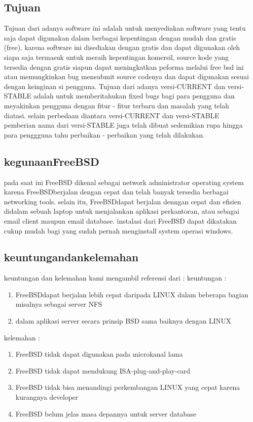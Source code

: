 {\subsection{Tujuan}
	Tujuan dari adanya software ini adalah untuk menyediakan software yang tentu saja dapat digunakan dalam berbagai kepentingan dengan mudah dan gratis (free). karena software ini disediakan dengan gratis dan dapat digunakan oleh siapa saja termasuk untuk meraih kepentingan komersil, 
	source kode yang tersedia dengan gratis siapun dapat meningkatkan  peforma melalui free bsd ini atau memungkinkan bug mensubmit source codenya dan dapat digunakan sesuai dengan keinginan si pengguna.
	Tujuan dari adanya versi-CURRENT dan versi-STABLE adalah untuk memberitahukan fixed bugs bagi para pengguna
	dan meyakinkan pengguna dengan fitur - fitur terbaru dan masalah yang telah diatasi. selain perbedaan diantara versi-CURRENT dan versi-STABLE
	pemberian nama dari versi-STABLE juga telah dibuat sedemikian rupa hingga para penggguna tahu  perbaikan - perbaikan yang telah dilakukan.
\subsection{kegunaanFreeBSD}
	pada saat ini FreeBSD dikenal sebagai network administrator operating system karena FreeBSDberjalan dengan cepat dan telah banyak tersedia berbagai networking tools. selain itu, FreeBSDdapat berjalan denngan cepat dan efisien didalam sebuah laptop untuk menjalankan aplikasi perkantoran, atau sebagai email client maupun email database.
	instalasi dari FreeBSD dapat dikatakan cukup mudah bagi yang sudah pernah menginstall system operasi windows.
\subsection{keuntungandankelemahan}
	keuntungan dan kelemahan kami mengambil referensi dari : \cite{nugroho2015analisis}
	keuntungan :
\begin{enumerate}
	\item FreeBSDdapat berjalan lebih cepat daripada LINUX dalam beberapa bagian misalnya sebagai server NFS
	\item dalam aplikasi server secara prinsip BSD sama baiknya dengan LINUX
\end{enumerate}
	kelemahan :
\begin{enumerate}
	\item FreeBSD tidak dapat digunakan pada microkanal lama
	\item FreeBSD tidak dapat mendukung ISA-plug-and-play-card
	\item FreeBSD tidak bisa menandingi perkembangan LINUX yang cepat karena kurangnya developer
	\item FreeBSD belum jelas masa depannya untuk server database
\end{enumerate}
}
